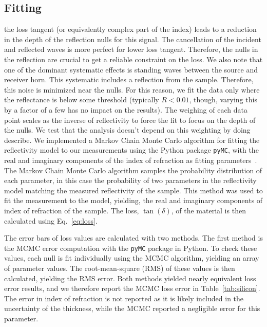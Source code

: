 \subsection{Fitting}
the loss tangent (or equivalently complex part of the index) leads to a reduction in the depth of the reflection nulls for this signal. The cancellation of the incident and reflected waves is more perfect for lower loss tangent. Therefore, the nulls in the reflection are crucial to get a reliable constraint on the loss. We also note that one of the dominant systematic effects is standing waves between the source and receiver horn. This systematic includes a reflection from the sample. Therefore, this noise is minimized near the nulls. For this reason, we fit the data only where the reflectance is below some threshold (typically $R<0.01$, though, varying this by a factor of a few has no impact on the results). The weighing of each data point scales as the inverse of reflectivity to force the fit to focus on the depth of the nulls. We test that the analysis doesn’t depend on this weighting by doing describe. We implemented a Markov Chain Monte Carlo algorithm for fitting the reflectivity model to our measurements using the Python package \verb|pyMC|, with the real and imaginary components of the index of refraction as fitting parameters~\cite{Patil2010PyMCBS}. The Markov Chain Monte Carlo algorithm samples the probability distribution of each parameter, in this case the probability of two parameters in the reflectivity model matching the measured reflectivity of the sample. This method was used to fit the measurement to the model, yielding, the real and imaginary components of index of refraction of the sample. The loss, $\tan(\delta)$, of the material is then calculated using Eq.~\ref{eq:loss}.

The error bars of loss values are calculated with two methods. The first method is the MCMC error computation with the \verb|pyMC| package in Python. To check these values, each null is fit individually using the MCMC algorithm, yielding an array of parameter values. The root-mean-square (RMS) of these values is then calculated, yielding the RMS error. Both methods yielded nearly equivalent loss error results, and we therefore report the MCMC loss error in Table~\ref{tab:silicon}. The error in index of refraction is not reported as it is likely included in the uncertainty of the thickness, while the MCMC reported a negligible error for this parameter.

